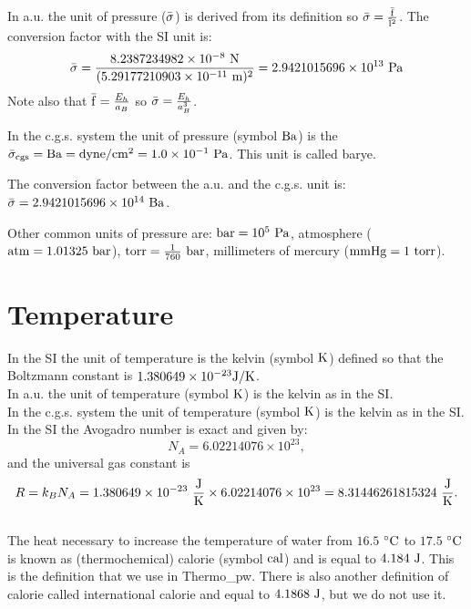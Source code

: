 \documentclass[12pt,a4paper,twoside]{report}
\def\tpw{{\sc Thermo}\_{\sc pw}}
\def\avonum{6.02214076\times 10^{23}}
\def\kb{1.380649\times 10^{-23}}
\def\rgas{8.31446261815324}
\def\barl{5.29177210903\times 10^{-11}}
\def\barf{8.2387234982\times 10^{-8}}
\def\barpr{2.9421015696\times 10^{13}}
\def\prtopr{1.0\times 10^{-1}}
\def\barprcgs{2.9421015696\times 10^{14}}
\begin{document}
{\color{web-blue} In a.u. the unit of pressure (${\rm \bar \sigma}$) is derived from 
its definition so ${\rm \bar \sigma}= {{\rm \bar f} \over {\rm \bar l}^2}$. The conversion
factor with the SI unit is:
\begin{equation}
{\rm \bar \sigma}= {\barf\ {\rm N} \over (\barl\ {\rm m} )^2}=\barpr\ {\rm Pa}
\end{equation}
Note also that ${\rm \bar f} = {E_h \over a_B}$ so 
${\rm \bar \sigma} = {E_h \over a_B^3}$.
}

{\color{orange} In the c.g.s. system the unit of pressure (symbol ${\rm Ba}$)
is the ${\rm \bar \sigma_{cgs}}={\rm Ba}={\rm dyne}/{\rm cm}^2 = \prtopr\ {\rm Pa}$. This unit is 
called barye. 
\\
}

{\color{green} The conversion factor between the a.u. and the c.g.s. unit is:
${\rm \bar \sigma}=\barprcgs\ {\rm Ba}$.
\\
}

{\color{red} Other common units of pressure are:
${\rm bar}=10^5\ {\rm Pa}$, atmosphere (${\rm atm}=1.01325\ {\rm bar}$), ${\rm torr}= {1\over 760}\ {\rm bar}$, 
millimeters of mercury (${\rm mmHg}=1\ {\rm torr}$).
}

\newpage
{\color{coral}\section{Temperature}}
\color{black}
In the SI the unit of temperature is the kelvin (symbol ${\rm K}$) defined
so that the Boltzmann constant is $\kb {\rm J} / {\rm K}$.
\\

{\color{web-blue} In a.u. the unit of temperature (symbol ${\rm K}$) is the 
kelvin as in the SI.}
\\

{\color{orange} In the c.g.s. system the unit of temperature 
(symbol ${\rm K}$) 
is the kelvin as in the SI.}
\\

{\color{red} In the SI the Avogadro number is exact and given by:
\begin{equation}
N_A=\avonum,
\end{equation}
and the universal gas constant is 
\begin{equation}
R=k_B N_A = \kb\ {{\rm J}\over {\rm K}} \times \avonum = \rgas\ {{\rm J}
\over {\rm K}}.
\end{equation}
\\

The heat necessary to increase the temperature of water from $16.5$ 
$^\circ{\rm C}$
to $17.5$ $^\circ{\rm C}$ is known as (thermochemical) calorie 
(symbol ${\rm cal}$) and 
is equal to $4.184\ {\rm J}$. This is the definition that we use in \tpw. 
There is also another definition of calorie called international calorie and
equal to $4.1868\ {\rm J}$, but we do not use it.
}
\end{document}
